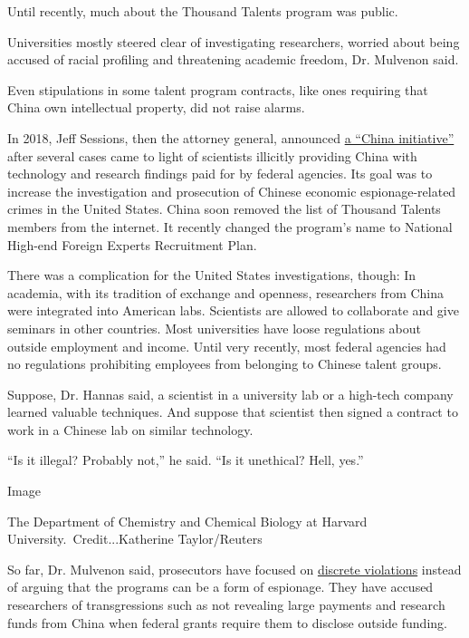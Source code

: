 Until recently, much about the Thousand Talents program was public.

Universities mostly steered clear of investigating researchers, worried
about being accused of racial profiling and threatening academic
freedom, Dr. Mulvenon said.

Even stipulations in some talent program contracts, like ones requiring
that China own intellectual property, did not raise alarms.

In 2018, Jeff Sessions, then the attorney general, announced
\href{https://www.justice.gov/opa/speech/file/1107256/download}{a
``China initiative''} after several cases came to light of scientists
illicitly providing China with technology and research findings paid for
by federal agencies. Its goal was to increase the investigation and
prosecution of Chinese economic espionage-related crimes in the United
States. China soon removed the list of Thousand Talents members from the
internet. It recently changed the program's name to National High-end
Foreign Experts Recruitment Plan.

There was a complication for the United States investigations, though:
In academia, with its tradition of exchange and openness, researchers
from China were integrated into American labs. Scientists are allowed to
collaborate and give seminars in other countries. Most universities have
loose regulations about outside employment and income. Until very
recently, most federal agencies had no regulations prohibiting employees
from belonging to Chinese talent groups.

Suppose, Dr. Hannas said, a scientist in a university lab or a high-tech
company learned valuable techniques. And suppose that scientist then
signed a contract to work in a Chinese lab on similar technology.

``Is it illegal? Probably not,'' he said. ``Is it unethical? Hell,
yes.''

Image

The Department of Chemistry and Chemical Biology at Harvard
University.~Credit...Katherine Taylor/Reuters

So far, Dr. Mulvenon said, prosecutors have focused on
\href{https://www.nytimes3xbfgragh.onion/2019/11/04/health/china-nih-scientists.html?searchResultPosition=1}{discrete
violations} instead of arguing that the programs can be a form of
espionage. They have accused researchers of transgressions such as not
revealing large payments and research funds from China when federal
grants require them to disclose outside funding.

